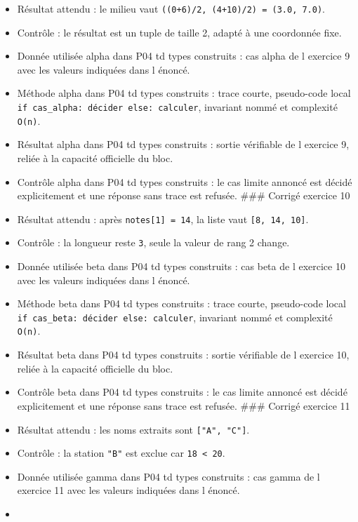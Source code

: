 \begin{itemize}
\tightlist
\item
  Résultat attendu : le milieu vaut
  \texttt{((0+6)/2,\ (4+10)/2)\ =\ (3.0,\ 7.0)}.
\item
  Contrôle : le résultat est un tuple de taille 2, adapté à une
  coordonnée fixe.
\item
  Donnée utilisée alpha dans P04 td types construits : cas alpha de l
  exercice 9 avec les valeurs indiquées dans l énoncé.
\item
  Méthode alpha dans P04 td types construits : trace courte, pseudo-code
  local \texttt{if\ cas\_alpha:\ décider\ else:\ calculer}, invariant
  nommé et complexité \texttt{O(n)}.
\item
  Résultat alpha dans P04 td types construits : sortie vérifiable de l
  exercice 9, reliée à la capacité officielle du bloc.
\item
  Contrôle alpha dans P04 td types construits : le cas limite annoncé
  est décidé explicitement et une réponse sans trace est refusée. \#\#\#
  Corrigé exercice 10
\item
  Résultat attendu : après \texttt{notes{[}1{]}\ =\ 14}, la liste vaut
  \texttt{{[}8,\ 14,\ 10{]}}.
\item
  Contrôle : la longueur reste \texttt{3}, seule la valeur de rang 2
  change.
\item
  Donnée utilisée beta dans P04 td types construits : cas beta de l
  exercice 10 avec les valeurs indiquées dans l énoncé.
\item
  Méthode beta dans P04 td types construits : trace courte, pseudo-code
  local \texttt{if\ cas\_beta:\ décider\ else:\ calculer}, invariant
  nommé et complexité \texttt{O(n)}.
\item
  Résultat beta dans P04 td types construits : sortie vérifiable de l
  exercice 10, reliée à la capacité officielle du bloc.
\item
  Contrôle beta dans P04 td types construits : le cas limite annoncé est
  décidé explicitement et une réponse sans trace est refusée. \#\#\#
  Corrigé exercice 11
\item
  Résultat attendu : les noms extraits sont \texttt{{[}"A",\ "C"{]}}.
\item
  Contrôle : la station \texttt{"B"} est exclue car
  \texttt{18\ \textless{}\ 20}.
\item
  Donnée utilisée gamma dans P04 td types construits : cas gamma de l
  exercice 11 avec les valeurs indiquées dans l énoncé.
\item

\end{itemize}
